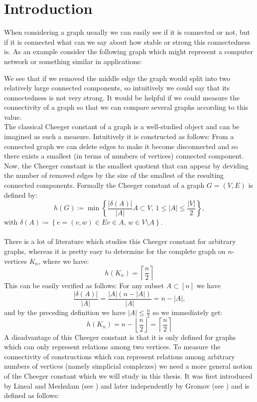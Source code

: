 
\chapter{Introduction}

\label{Introduction}
When considering a graph usually we can easily see if it is connected or not, but if it is connected what can we say about how stable or strong this connectedness is. As an example consider the following graph which might represent a computer network or something similar in applications:



We see that if we removed the middle edge the graph would split into two relatively large connected components, so intuitively we could say that its connectedness is not very strong. It would be helpful if we could measure the connectivity of a graph so that we can compare several graphs according to this value.\\
The classical Cheeger constant of a graph is a well-studied object and can be imagined as such a measure. Intuitively it is constructed as follows: From a connected graph we can delete edges to make it become disconnected and so there exists a smallest (in terms of numbers of vertices) connected component. Now, the Cheeger constant is the smallest quotient that can appear by deviding the number of removed edges by the size of the smallest of the resulting connected components. Formally the Cheeger constant of a graph \(G=(V,E)\) is defined by:
\[
h(G)\coloneqq \min\left\{\frac{|\delta(A)|}{|A|}A\subset V\text{, }1\leq |A|\leq\frac{|V|}{2}\right\},
\]
with \(\delta(A)\coloneqq \left\{e=(v,w)\in Ev\in A\text{, }w\in V\setminus A\right\}\).\\
\\
There is a lot of literature which studies this Cheeger constant for arbitrary graphs, whereas it is pretty easy to determine for the complete graph on \(n\)-vertices \(K_n\), where we have:
\[
h(K_n)=\left\lceil\frac{n}{2}\right\rceil
\]
This can be easily verified as follows: For any subset \(A\subset [n]\) we have
\[
\frac{|\delta(A)|}{|A|}=\frac{|A|(n-|A|)}{|A|}=n-|A|,
\]
and by the preceding definition we have \(|A|\leq\frac{n}{2}\) so we immediately get:
\[
h(K_n)=n-\left\lfloor\frac{n}{2}\right\rfloor=\left\lceil\frac{n}{2}\right\rceil
\]
A disadvantage of this Cheeger constant is that it is only defined for graphs which can only represent relations among two vertices. To measure the connectivity of constructions which can represent relations among arbitrary numbers of vertices (namely simplicial complexes) we need a more general notion of the Cheeger constant which we will study in this thesis. It was first introduced by Lineal and Meshulam (see \cite{2}) and later independently by Gromov (see \cite{3}) and is defined as follows:\\

